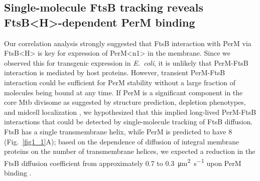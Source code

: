 \documentclass[twocolumn,pdflatex,sn-nature]{sn-jnl}%
\def\textsuperscript#1{<#1>}%
\newcommand\ec{\textit{E.~coli}}
\newcommand\mtb{Mtb}
\newcommand\ftsbH{FtsB\textsuperscript{H}}
\newcommand\permN{PerM\textsuperscript{n1}}
\begin{document}
\subsection{Single-molecule FtsB tracking reveals \ftsbH{}-dependent PerM binding}

Our correlation analysis strongly suggested that FtsB interaction with PerM via \ftsbH{} is key for expression of \permN{} in the membrane.
Since we observed this for transgenic expression in \ec{}, it is unlikely that PerM-FtsB interaction is mediated by host proteins.
However, transient PerM-FtsB interaction could be sufficient for PerM stability without a large fraction of molecules being bound at any time.
If PerM is a significant component in the core \mtb{} divisome as suggested by structure prediction, depletion phenotypes, and midcell localization \citep{goodsmithDisruptionTuberculosisMembrane2015, wangPersistentMycobacteriumTuberculosis2019}, we hypothesized that this implied long-lived PerM-FtsB interactions that could be detected by single-molecule tracking of FtsB diffusion.
FtsB has a single transmembrane helix, while PerM is predicted to have 8 (Fig.~\ref{fig1_1}A); based on the dependence of diffusion of integral membrane proteins on the number of transmembrane helices, we expected a reduction in the FtsB diffusion coefficient from approximately 0.7 to \qty{0.3}{\square\um\per\s} upon PerM binding \citep{lucenaMicrodomainFormationGeneral2018}.
\end{document}
